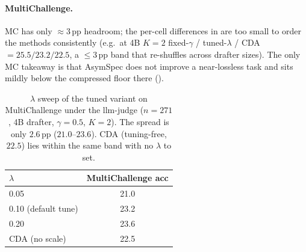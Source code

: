 \documentclass[11pt]{article}
\theoremstyle{plain}
\theoremstyle{definition}
\begin{document}
\paragraph{MultiChallenge.} MC has only $\approx$3\,pp headroom; the per-cell differences in  are too small to order the methods consistently (e.g.\ at 4B $K{=}2$ fixed-$\gamma$ / tuned-$\lambda$ / CDA $=25.5/23.2/22.5$, a $\le$3\,pp band that re-shuffles across drafter sizes). The only MC takeaway is that AsymSpec does not improve a near-lossless task and sits mildly below the compressed floor there ().

\begin{table}[!h]
\centering
\footnotesize
{}
\caption{Drafter-size sweep on LongBench F1 ($\gamma{=}0.5$, $\lambda{=}0.1$ for the tuned variant). CDA is the parameter-free JSD gate (\S\ref{sec:method-cda}); the 4B row (our default drafter) is its JSD instantiation of record, the smaller-drafter rows the accuracy-equivalent KL instantiation (). \emph{Drafter alone}: the SLM on full passages, no verifier --- reference upper bound for what the small model can do unassisted (K-independent).}
\label{tab:drafter_sweep}
\end{table}

\begin{table}[t]
\centering
\footnotesize
\setlength{\tabcolsep}{6pt}
\begin{tabular}{lc}
\toprule
$\lambda$ & MultiChallenge acc \\
\midrule
0.05             & 21.0 \\
0.10 (default tune) & 23.2 \\
0.20             & 23.6 \\
\midrule
CDA (no scale) & 22.5 \\
\bottomrule
\end{tabular}
\caption{$\lambda$ sweep of the tuned variant on MultiChallenge under the llm-judge ($n{=}271$, 4B drafter, $\gamma{=}0.5$, $K{=}2$). The spread is only $2.6$\,pp ($21.0$--$23.6$). CDA (tuning-free, $22.5$) lies within the same band with no $\lambda$ to set.}
\label{tab:lambda_sweep}
\end{table}
\end{document}
